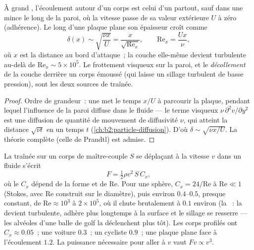 \begin{proposition}\label{prop:b2:viscous-flows:bl}
À grand , l'écoulement autour d'un corps est celui d'un  partout, sauf dans une mince \emph{} le long de la paroi,
où la vitesse passe de sa valeur extérieure $U$ à zéro (adhérence).
Le long d'une plaque plane son épaisseur croît comme
\[
\delta(x) \sim \sqrt{\frac{\nu x}{U}} = \frac{x}{\sqrt{\mathrm{Re}_x}} ,
\qquad \mathrm{Re}_x = \frac{Ux}{\nu} ,
\]
où $x$ est la distance au bord d'attaque~; la couche elle-même devient
turbulente au-delà de $\mathrm{Re}_x \sim 5 \times 10^5$. Le frottement visqueux sur la
paroi, et le \emph{décollement} de la couche derrière un corps émoussé (qui
laisse un sillage turbulent de basse pression), sont les deux sources de traînée.
\end{proposition}

\begin{proof}
Ordre de grandeur~: une  met le temps $x/U$ à parcourir
la plaque, pendant lequel l'influence de la paroi diffuse dans le
fluide --- le terme visqueux $\nu\,\partial^2v/\partial y^2$ est une diffusion de
quantité de mouvement de diffusivité $\nu$, qui atteint la distance $\sqrt{\nu t}$ en
un temps $t$ (\cref{ch:b2:particle-diffusion}). D'où $\delta \sim \sqrt{\nu x
/U}$. La théorie complète (celle de Prandtl) est admise.
\end{proof}

\begin{proposition}\label{prop:b2:viscous-flows:drag}
La traînée sur un corps de maître-couple $S$ se déplaçant à la vitesse $v$ dans un fluide s'écrit
\[
F = \tfrac12\rho v^2\,S\,C_x ,
\]
où le \emph{} $C_x$ dépend de la forme et de
$\mathrm{Re}$. Pour une sphère, $C_x = 24/\mathrm{Re}$ à $\mathrm{Re} \ll 1$ (Stokes,
avec $\mathrm{Re}$ construit sur le diamètre), puis environ $0.4$--$0.5$, presque
constant, de $\mathrm{Re} \approx 10^3$ à $2 \times 10^5$, où il chute
brutalement à $0.1$ environ (la \emph{}~: la  devient
turbulente, adhère plus longtemps à la surface et le sillage se resserre --- les
alvéoles d'une balle de golf la déclenchent plus tôt). Les corps profilés ont
$C_x \approx 0.05$~; une voiture $0.3$~; un cycliste $0.9$~; une plaque plane face à l'écoulement
$1.2$. La puissance nécessaire pour aller à $v$ vaut $Fv \propto v^3$.
\end{proposition}
\admitted

